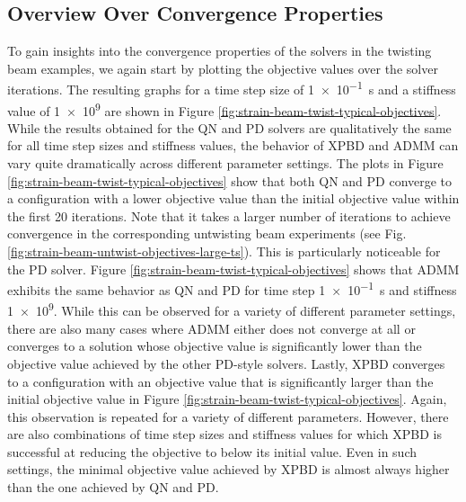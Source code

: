 \subsection{Overview Over Convergence Properties}\label{ss:twisting-beam-strain-convergence}
To gain insights into the convergence properties of the solvers in the twisting beam examples, we again start by plotting the objective values over 
the solver iterations. The resulting graphs for a time step size of \SI{1e-1}{\second} and a stiffness value of \num{1e9} are shown in 
Figure \ref{fig:strain-beam-twist-typical-objectives}. While the results obtained for the QN and PD solvers are qualitatively the same for all time step 
sizes and stiffness values, the behavior of XPBD and ADMM can vary quite dramatically across different parameter settings. The plots in 
Figure \ref{fig:strain-beam-twist-typical-objectives} show that both QN and PD converge to a configuration with a lower objective value than the initial 
objective value within the first 20 iterations. Note that it takes a larger number of iterations to achieve convergence in the corresponding untwisting beam experiments 
(see Fig. \ref{fig:strain-beam-untwist-objectives-large-ts}). This is particularly noticeable for the PD solver. Figure \ref{fig:strain-beam-twist-typical-objectives} 
shows that ADMM exhibits the same behavior as QN and PD for time step \SI{1e-1}{\second} and stiffness \num{1e9}. While this can be observed for a variety of 
different parameter settings, there are also many cases where ADMM either does not converge at all or converges to a solution whose objective value is 
significantly lower than the objective value achieved by the other PD-style solvers. Lastly, XPBD converges to a configuration with an objective value that is 
significantly larger than the initial objective value in Figure \ref{fig:strain-beam-twist-typical-objectives}. Again, this observation is repeated for a variety of 
different parameters. However, there are also combinations of time step sizes and stiffness values for which XPBD is successful at reducing the objective to 
below its initial value. Even in such settings, the minimal objective value achieved by XPBD is almost always higher than the one achieved by QN and PD.

